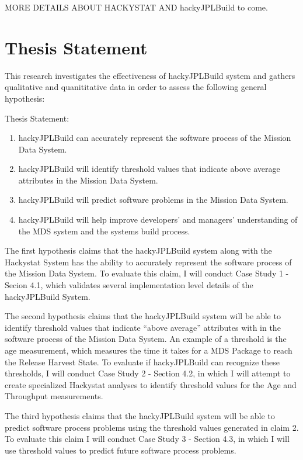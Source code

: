 MORE DETAILS ABOUT HACKYSTAT AND hackyJPLBuild to come.

\section{Thesis Statement}
This research investigates the effectiveness of hackyJPLBuild system and
gathers qualitative and quanititative data in order to assess the following 
general hypothesis:

\begin{description}
\item Thesis Statement:
\begin{enumerate}
\item hackyJPLBuild can accurately represent the software process of the
Mission Data System.
\item hackyJPLBuild will identify threshold values that indicate above
average attributes in the Mission Data System.
\item hackyJPLBuild will predict software problems in the Mission Data
System.
\item hackyJPLBuild will help improve developers' and managers'
  understanding of the MDS system and the systems build process.
\end{enumerate}
\end{description}

The first hypothesis claims that the hackyJPLBuild system along with the
Hackystat System has the ability to accurately represent the software
process of the Mission Data System.  To evaluate this claim, I will conduct
Case Study 1 - Secion 4.1, which validates several implementation level
details of the hackyJPLBuild System.

The second hypothesis claims that the hackyJPLBuild system will be able to
identify threshold values that indicate ``above average'' attributes with in
the software process of the Mission Data System.  An example of a threshold 
is the age measurement, which measures the time it takes for a MDS Package
to reach the Release Harvest State.  To evaluate if hackyJPLBuild can
recognize these thresholds, I will conduct Case Study 2 - Section 4.2, in
which I will attempt to create specialized Hackystat analyses to identify
threshold values for the Age and Throughput measurements.

The third hypothesis claims that the hackyJPLBuild system will be able to
predict software process problems using the threshold values generated in
claim 2.  To evaluate this claim I will conduct Case Study 3 - Section
4.3, in which I will use threshold values to predict future software
process problems.

